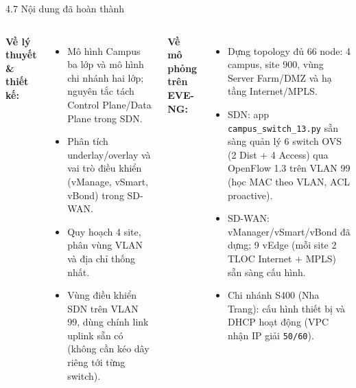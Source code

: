 \begin{frame}{4.7 Nội dung đã hoàn thành}
    \begin{columns}[T]
        \textbf{Về lý thuyết \& thiết kế:}
        \begin{itemize}
            \item Mô hình Campus ba lớp và mô hình chi nhánh hai lớp;
                nguyên tắc tách Control Plane/Data Plane trong SDN.
            \item Phân tích underlay/overlay và vai trò điều khiển
                (vManage, vSmart, vBond) trong SD-WAN.
            \item Quy hoạch 4 site, phân vùng VLAN và địa chỉ thống nhất.
            \item Vùng điều khiển SDN trên VLAN 99, dùng chính link
                uplink sẵn có (không cần kéo dây riêng tới từng switch).
        \end{itemize}

        \textbf{Về mô phỏng trên EVE-NG:}
        \begin{itemize}
            \item Dựng topology đủ 66 node: 4 campus, site 900,
                vùng Server Farm/DMZ và hạ tầng Internet/MPLS.
            \item SDN: app \texttt{campus\_switch\_13.py} sẵn sàng quản
                lý 6 switch OVS (2 Dist + 4 Access) qua OpenFlow 1.3
                trên VLAN 99 (học MAC theo VLAN, ACL proactive).
            \item SD-WAN: vManager/vSmart/vBond đã dựng; 9 vEdge
                (mỗi site 2 TLOC Internet + MPLS) sẵn sàng cấu hình.
            \item Chi nhánh S400 (Nha Trang): cấu hình thiết bị và
                DHCP hoạt động (VPC nhận IP giải \texttt{50/60}).
        \end{itemize}
    \end{columns}
\end{frame}

